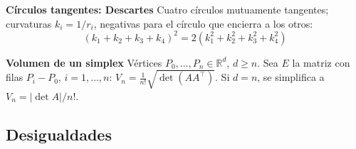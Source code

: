 \textbf{Círculos tangentes: Descartes}
Cuatro círculos mutuamente tangentes; curvaturas
$k_i=1/r_i$, negativas para el círculo que encierra a los otros:
\begin{equation*}
    (k_1+k_2+k_3+k_4)^2 = 2\left( k_1^2 +k_2^2 +k_3^2 +k_4^2   \right)
\end{equation*}



\textbf{Volumen de un simplex}
Vértices $P_0,\ldots,P_n\in\mathbb R^d$, $d\ge n$.
Sea $E$ la matriz con filas $P_i-P_0$, $i=1,\ldots,n$:
$
V_n=\frac{1}{n!}\sqrt{\det(AA^\top)}.
$
Si $d=n$, se simplifica a $V_n=|\det A|/n!$.


\subsection{Desigualdades}

